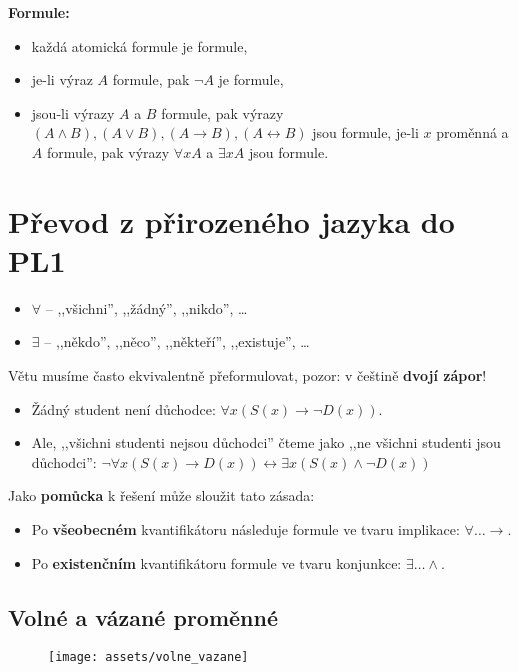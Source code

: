 \noindent\textbf{Formule:}
\begin{itemize}
    \item každá atomická formule je formule,
    \item je-li výraz $ A $ formule, pak $\neg A$ je formule,
    \item jsou-li výrazy $A$ a $B$ formule, pak výrazy $(A \land B), (A \lor B), (A \rightarrow B), (A \leftrightarrow B)$ jsou formule, je-li $ x $ proměnná a $A$ formule, pak výrazy $\forall x A$ a $\exists x A$ jsou formule.
\end{itemize}

\section{Převod z přirozeného jazyka do PL1}
\begin{itemize}
    \item $\forall$ -- ,,všichni'', ,,žádný'', ,,nikdo'', \ldots
    \item $\exists$ --  ,,někdo'', ,,něco'', ,,někteří'', ,,existuje'', \ldots
\end{itemize}

\noindent Větu musíme často ekvivalentně přeformulovat, pozor: v češtině \textbf{dvojí zápor}!
\begin{itemize}
    \item Žádný student není důchodce: $\forall x (S(x) \rightarrow \neg D(x))$.
    \item Ale, ,,všichni studenti nejsou důchodci'' čteme jako ,,ne všichni studenti jsou důchodci'':
          $\neg \forall x (S(x) \rightarrow D(x)) \leftrightarrow \exists x (S(x) \land \neg D(x))$
\end{itemize}

\noindent Jako \textbf{pomůcka} k řešení může sloužit tato zásada:
\begin{itemize}
    \item Po \textbf{všeobecném} kvantifikátoru následuje formule ve tvaru implikace: $\forall \ldots \rightarrow$.
    \item Po \textbf{existenčním} kvantifikátoru formule ve tvaru konjunkce:  $\exists \ldots \land$.
\end{itemize}

\subsection{Volné a vázané proměnné}
\begin{figure}[H]
    \centering
    \texttt{[image: assets/volne\_vazane]}
\end{figure}

